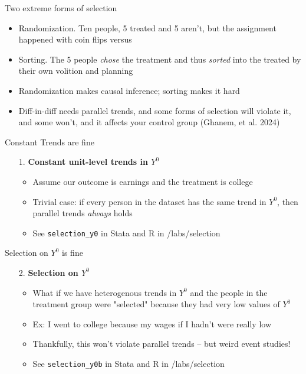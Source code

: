 \documentclass{beamer}
\begin{document}
\begin{frame}{Two extreme forms of selection}

\begin{itemize}
\item Randomization.  Ten people, 5 treated and 5 aren't, but the assignment happened with coin flips versus
\item Sorting.  The 5 people \emph{chose} the treatment and thus \emph{sorted} into the treated by their own volition and planning
\item Randomization makes causal inference; sorting makes it hard
\item Diff-in-diff needs parallel trends, and some forms of selection will violate it, and some won't, and it affects your control group (Ghanem, et al. 2024)
\end{itemize}

\end{frame}



\begin{frame}{Constant Trends are fine}
\begin{enumerate}
    \item[1.]  \textbf{Constant unit-level trends in $Y^0$}
	\begin{itemize}
	\item Assume our outcome is earnings and the treatment is college
	\item Trivial case: if every person in the dataset has the same trend in $Y^0$, then parallel trends \emph{always} holds
	\item See \texttt{selection_y0} in Stata and R in /labs/selection
	\end{itemize}
\end{enumerate}
\end{frame}

\begin{frame}{Selection on $Y^0$ is fine}
\begin{enumerate}
    \item[2.]  \textbf{Selection on $Y^0$}
	\begin{itemize}
	\item What if we have heterogenous trends in $Y^0$ and the people in the treatment group were "selected" because they had very low values of $Y^0$
	\item Ex: I went to college because my wages if I hadn't were really low
	\item Thankfully, this won't violate parallel trends -- but weird event studies!
	\item See \texttt{selection_y0b} in Stata and R in /labs/selection
	\end{itemize}
\end{enumerate}
\end{frame}
\end{document}
